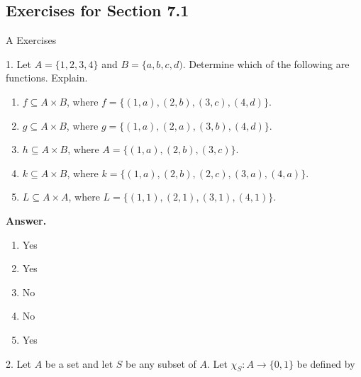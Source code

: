 \documentclass[10pt,]{book}
\theoremstyle{plain}
\theoremstyle{definition}
\theoremstyle{definition}
\theoremstyle{definition}
\begin{document}
\subsection[Exercises for Section 7.1 ]{Exercises for Section 7.1 }\label{exercises-7-1}
\hypertarget{exercisegroup-1}{}\typeout{************************************************}
\typeout{************************************************}
A Exercises%
\begin{exercisegroup}
\item[1.]\hypertarget{exercise-1}{} Let \(A = \{1, 2, 3, 4\}\) and \(B = \{a,b, c, d)\). Determine which of the following are functions. Explain.%
\par
\leavevmode%
\begin{enumerate}[label=\alph*]
\item\hypertarget{li-3}{} \(f \subseteq  A \times  B\), where \(f = \{(1, a), (2, b), (3, c), (4, d)\}\).%
\item\hypertarget{li-4}{} \(g\subseteq A\times B\), where \(g = \{(1, a), (2, a), (3,b), (4,d)\}\).%
\item\hypertarget{li-5}{} \(h \subseteq A \times  B\), where \(A = \{(1, a), (2, b), (3, c)\}\).%
\item\hypertarget{li-6}{} \(k \subseteq A\times  B\), where \(k = \{(1, a), (2, b), (2, c), (3, a), (4, a)\}\).%
\item\hypertarget{li-7}{} \(L\subseteq A\times A\), where \(L = \{(1, 1), (2, 1), (3, 1), (4, 1)\}\).%
\end{enumerate}
%
\par\smallskip
\par\smallskip
\noindent\textbf{Answer.}\hypertarget{answer-1}{}\quad
\leavevmode%
\begin{multicols}{3}
\begin{enumerate}[label=\alph*]
\item\hypertarget{li-8}{} Yes %
\item\hypertarget{li-9}{} Yes %
\item\hypertarget{li-10}{} No %
\item\hypertarget{li-11}{}No%
\item\hypertarget{li-12}{}Yes%
\end{enumerate}
\end{multicols}
%
\item[2.]\hypertarget{exercise-characteristic-function}{} Let \(A\) be a set and let \(S\) be any subset of \(A\). Let \(\chi _S: A\to \{0,1\}\) be defined by




\end{exercisegroup}
\end{document}
